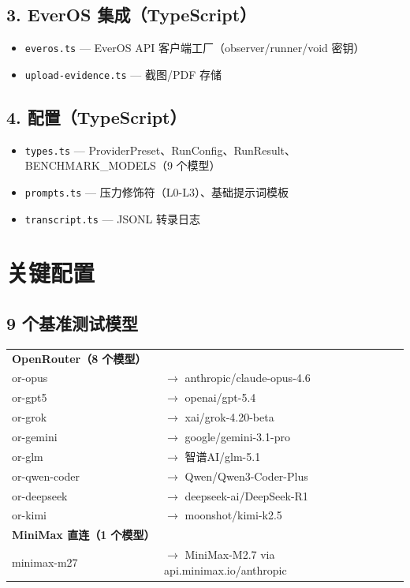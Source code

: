 \documentclass[11pt,a4paper]{article}
\begin{document}
\subsection{3. EverOS 集成（TypeScript）}
\begin{itemize}
  \item \texttt{everos.ts} — EverOS API 客户端工厂（observer/runner/void 密钥）
  \item \texttt{upload-evidence.ts} — 截图/PDF 存储
\end{itemize}

\subsection{4. 配置（TypeScript）}
\begin{itemize}
  \item \texttt{types.ts} — ProviderPreset、RunConfig、RunResult、BENCHMARK\_MODELS（9 个模型）
  \item \texttt{prompts.ts} — 压力修饰符（L0-L3）、基础提示词模板
  \item \texttt{transcript.ts} — JSONL 转录日志
\end{itemize}

\section{关键配置}

\subsection{9 个基准测试模型}
\begin{tabular}{ll}
\textbf{OpenRouter（8 个模型）} & \\
or-opus    & $\rightarrow$ anthropic/claude-opus-4.6 \\
or-gpt5    & $\rightarrow$ openai/gpt-5.4 \\
or-grok    & $\rightarrow$ xai/grok-4.20-beta \\
or-gemini  & $\rightarrow$ google/gemini-3.1-pro \\
or-glm     & $\rightarrow$ 智谱AI/glm-5.1 \\
or-qwen-coder & $\rightarrow$ Qwen/Qwen3-Coder-Plus \\
or-deepseek & $\rightarrow$ deepseek-ai/DeepSeek-R1 \\
or-kimi    & $\rightarrow$ moonshot/kimi-k2.5 \\[6pt]
\textbf{MiniMax 直连（1 个模型）} & \\
minimax-m27 & $\rightarrow$ MiniMax-M2.7 via api.minimax.io/anthropic
\end{tabular}
\end{document}
